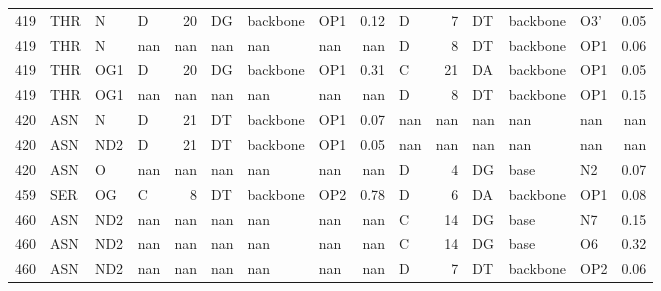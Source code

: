 \begin{longtable}{rlllrlllrlrlllr}
       419 & THR        & N      & D         &          20 & DG           & backbone    & OP1      &          0.12 & D         &           7 & DT           & backbone    & O3'      &          0.05 \\
       419 & THR        & N      & nan       &         nan & nan          & nan         & nan      &        nan    & D         &           8 & DT           & backbone    & OP1      &          0.06 \\
       419 & THR        & OG1    & D         &          20 & DG           & backbone    & OP1      &          0.31 & C         &          21 & DA           & backbone    & OP1      &          0.05 \\
       419 & THR        & OG1    & nan       &         nan & nan          & nan         & nan      &        nan    & D         &           8 & DT           & backbone    & OP1      &          0.15 \\
       420 & ASN        & N      & D         &          21 & DT           & backbone    & OP1      &          0.07 & nan       &         nan & nan          & nan         & nan      &        nan    \\
       420 & ASN        & ND2    & D         &          21 & DT           & backbone    & OP1      &          0.05 & nan       &         nan & nan          & nan         & nan      &        nan    \\
       420 & ASN        & O      & nan       &         nan & nan          & nan         & nan      &        nan    & D         &           4 & DG           & base        & N2       &          0.07 \\
       459 & SER        & OG     & C         &           8 & DT           & backbone    & OP2      &          0.78 & D         &           6 & DA           & backbone    & OP1      &          0.08 \\
       460 & ASN        & ND2    & nan       &         nan & nan          & nan         & nan      &        nan    & C         &          14 & DG           & base        & N7       &          0.15 \\
       460 & ASN        & ND2    & nan       &         nan & nan          & nan         & nan      &        nan    & C         &          14 & DG           & base        & O6       &          0.32 \\
       460 & ASN        & ND2    & nan       &         nan & nan          & nan         & nan      &        nan    & D         &           7 & DT           & backbone    & OP2      &          0.06 \\

\end{longtable}

